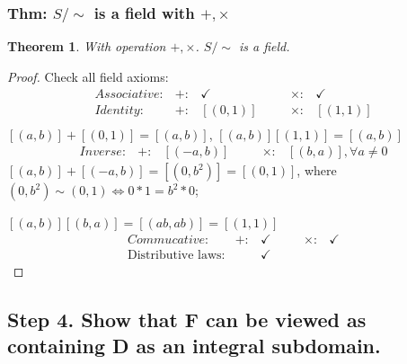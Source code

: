 \documentclass[11pt,a4paper]{article}
\newtheorem{theorem}{Theorem}
\begin{document}
\subsubsection{Thm: $S/\sim$ is a field with $+,\times$}
\begin{theorem}
    With operation $+,\times$. $S/\sim$ is a field.
\end{theorem}
\begin{proof}
Check all field axioms:
\begin{equation}
    \begin{aligned}
        Associative:& +:&\checkmark&\quad&\times:& \checkmark\\
        Identity:& +:&[(0,1)]&\quad&\times:& [(1,1)]\\
    \end{aligned}
    \nonumber
\end{equation}
$[(a,b)]+[(0,1)]=[(a,b)]$, $[(a,b)][(1,1)]=[(a,b)]$
\begin{equation}
    \begin{aligned}
        Inverse:& +:&[(-a,b)]&\quad&\times:& [(b,a)],\forall a\neq 0
    \end{aligned}
    \nonumber
\end{equation}
$[(a,b)]+[(-a,b)]=[(0,b^2)]=[(0,1)]$, where $(0,b^2)\sim (0,1) \Leftrightarrow 0*1=b^2*0$;

$[(a,b)][(b,a)]=[(ab,ab)]=[(1,1)]$
\begin{equation}
    \begin{aligned}
        Commucative:& +:&\checkmark&\quad&\times:& \checkmark\\
        \text{Distributive laws}:&&\checkmark&&&
    \end{aligned}
    \nonumber
\end{equation}
\end{proof}

\subsection{Step 4. Show that F can be viewed as containing D as an integral subdomain.}
\end{document}
